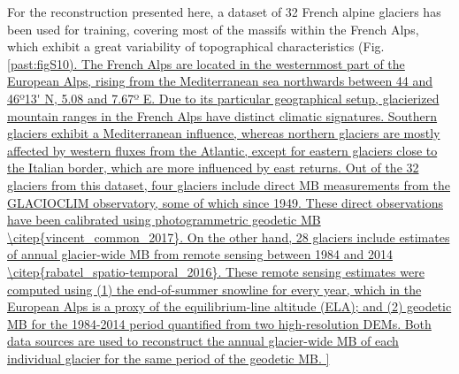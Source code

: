 For the reconstruction presented here, a dataset of 32 French alpine glaciers has been used for training, covering most of the massifs within the French Alps, which exhibit a great variability of topographical characteristics (Fig. \ref{past:figS10). The French Alps are located in the westernmost part of the European Alps, rising from the Mediterranean sea northwards between 44 and 46º13' N, 5.08 and 7.67º E. Due to its particular geographical setup, glacierized mountain ranges in the French Alps have distinct climatic signatures. Southern glaciers exhibit a Mediterranean influence, whereas northern glaciers are mostly affected by western fluxes from the Atlantic, except for eastern glaciers close to the Italian border, which are more influenced by east returns. 

Out of the 32 glaciers from this dataset, four glaciers include direct MB measurements from the GLACIOCLIM observatory, some of which since 1949. These direct observations have been calibrated using photogrammetric geodetic MB \citep{vincent_common_2017}. On the other hand, 28 glaciers include estimates of annual glacier-wide MB from remote sensing between 1984 and 2014 \citep{rabatel_spatio-temporal_2016}. These remote sensing estimates were computed using (1) the end-of-summer snowline for every year, which in the European Alps is a proxy of the equilibrium-line altitude (ELA); and (2) geodetic MB for the 1984-2014 period quantified from two high-resolution DEMs. Both data sources are used to reconstruct the annual glacier-wide MB of each individual glacier for the same period of the geodetic MB. 

}
